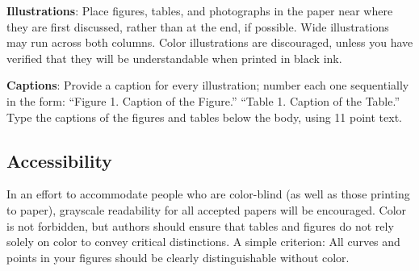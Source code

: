 \documentclass[11pt,a4paper]{article}
\begin{document}
{\bf Illustrations}: Place figures, tables, and photographs in the
paper near where they are first discussed, rather than at the end, if
possible.  Wide illustrations may run across both columns.  Color
illustrations are discouraged, unless you have verified that  
they will be understandable when printed in black ink.

{\bf Captions}: Provide a caption for every illustration; number each one
sequentially in the form:  ``Figure 1. Caption of the Figure.'' ``Table 1.
Caption of the Table.''  Type the captions of the figures and 
tables below the body, using 11 point text.


\subsection{Accessibility}
\label{ssec:accessibility}

In an effort to accommodate people who are color-blind (as well as those printing
to paper), grayscale readability for all accepted papers will be
encouraged.  Color is not forbidden, but authors should ensure that
tables and figures do not rely solely on color to convey critical
distinctions. A simple criterion: All curves and points in your figures should be clearly distinguishable without color.



\end{document}
